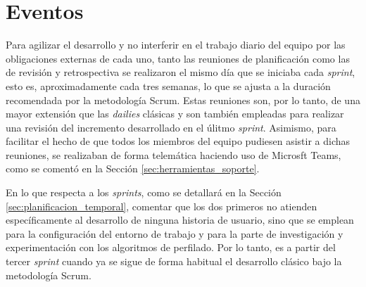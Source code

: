 \section{Eventos}
\label{sec:metodologia_eventos}

Para agilizar el desarrollo y no interferir en el trabajo diario del equipo por las obligaciones
externas de cada uno, tanto las reuniones de planificación como las de revisión y retrospectiva se realizaron
el mismo día que se iniciaba cada \textit{sprint}, esto es, aproximadamente cada tres semanas, lo que se ajusta a la duración recomendada
por la metodología Scrum. Estas reuniones son, por lo tanto, de una mayor extensión que las \textit{dailies} clásicas y son también empleadas
para realizar una revisión del incremento desarrollado en el úlitmo \textit{sprint}. Asimismo, para facilitar el hecho de que todos los miembros
del equipo pudiesen asistir a dichas reuniones, se realizaban de forma telemática haciendo uso de Microsft Teams, como se comentó en la Sección \ref{sec:herramientas_soporte}.

\bigskip
En lo que respecta a los \textit{sprints}, como se detallará en la Sección \ref{sec:planificacion_temporal}, comentar que los dos primeros
no atienden específicamente al desarrollo de ninguna historia de usuario, sino que se emplean para la configuración del entorno de trabajo
y para la parte de investigación y experimentación con los algoritmos de perfilado. Por lo tanto, es a partir del tercer \textit{sprint} cuando
ya se sigue de forma habitual el desarrollo clásico bajo la metodología Scrum.
